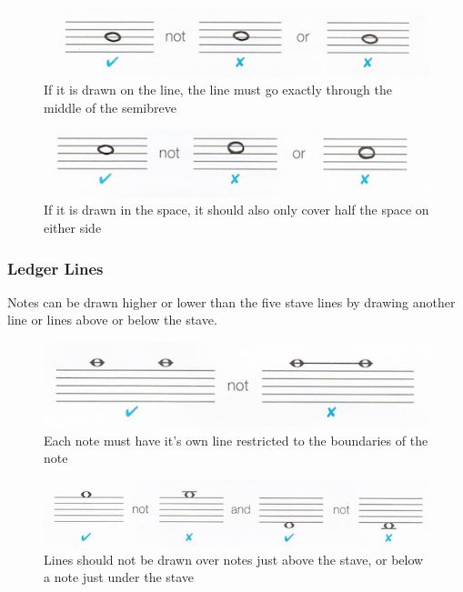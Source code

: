 \begin{figure}[h!]
  \includegraphics[width=\linewidth]{gfx/basic/semibreve-on-line.png}
  \centering
  \caption{If it is drawn on the line, the line must go exactly through the middle of the semibreve}
  \label{fig:SemibreveOnLine}
\end{figure}

\begin{figure}[h!]
  \includegraphics[width=\linewidth]{gfx/basic/semibreve-on-space.png}
  \centering
  \caption{If it is drawn in the space, it should also only cover half the space on either side}
  \label{fig:SemibreveOnSpace}
\end{figure}

\subsubsection{Ledger Lines}

Notes can be drawn higher or lower than the five stave lines by drawing another line or lines above or below the stave.

\begin{figure}[h!]
  \includegraphics[width=\linewidth]{gfx/basic/ledger-boundaries.png}
  \centering
  \caption{Each note must have it's own line restricted to the boundaries of the note}
  \label{fig:LedgerBoundaries}
\end{figure}


\begin{figure}[h!]
  \includegraphics[width=\linewidth]{gfx/basic/ledger-above.png}
  \centering
  \caption{Lines should not be drawn over notes just above the stave, or below a note just under the stave}
  \label{fig:LedgerAbove}
\end{figure}


